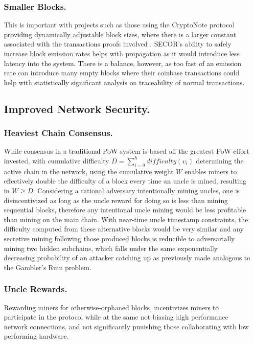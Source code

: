 \documentclass{article}
\begin{document}
\subsubsection{Smaller Blocks.}
This is important with projects such as those using the CryptoNote protocol providing dynamically adjustable block sizes, where there is a larger constant associated with the transactions proofs involved \cite{saberhagen}. SECOR's ability to safely increase block emission rates helps with propagation as it would introduce less latency into the system. There is a balance, however, as too fast of an emission rate can introduce many empty blocks where their coinbase transactions could help with statistically significant analysis on traceability of normal transactions.
\subsection{Improved Network Security.}
\subsubsection{Heaviest Chain Consensus.}
While consensus in a traditional PoW system is based off the greatest PoW effort invested, with cumulative difficulty $D = \sum_{i=0}^{h} difficulty(v_i)$ determining the active chain in the network, using the cumulative weight $W$ enables miners to effectively double the difficulty of a block every time an uncle is mined, resulting in $W \geq D$. Considering a rational adversary intentionally mining uncles, one is disincentivized as long as the uncle reward for doing so is less than mining sequential blocks, therefore any intentional uncle mining would be less profitable than mining on the main chain. With near-time uncle timestamp constraints, the difficulty computed from these alternative blocks would be very similar and any secretive mining following those produced blocks is reducible to adversarially mining two hidden subchains, which falls under the same exponentially decreasing probability of an attacker catching up as previously made analogous to the Gambler's Ruin problem\cite{nakamoto}.

\subsubsection{Uncle Rewards.}
Rewarding miners for otherwise-orphaned blocks, incentivizes miners to participate in the protocol while at the same not biasing high performance network connections, and not significantly punishing those collaborating with low performing hardware.
\end{document}

